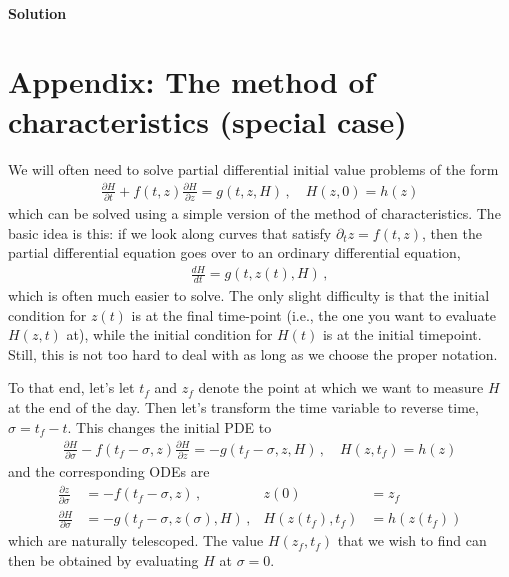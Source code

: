 \documentclass[11pt]{article}
\begin{document}
\paragraph{Solution}

\section{Appendix: The method of characteristics (special case)}

We will often need to solve partial differential initial value problems of the form
\begin{align}
\frac{\partial H}{\partial t} + f(t,z) \frac{\partial H}{\partial z} = g(t,z,H) \, , \quad H(z,0) = h(z) 
\end{align}
which can be solved using a simple version of the method of characteristics. The basic idea is this: if we look along curves that satisfy $\partial_t z = f(t,z)$, then the partial differential equation goes over to an ordinary differential equation,
\begin{align}
\frac{d H}{dt} = g(t,z(t),H) \, ,
\end{align} 
which is often much easier to solve. The only slight difficulty is that the initial condition for $z(t)$ is at the final time-point (i.e., the one you want to evaluate $H(z,t)$ at), while the initial condition for $H(t)$ is at the initial timepoint. Still, this is not too hard to deal with as long as we choose the proper notation. 

To that end, let's let $t_f$ and $z_f$ denote the point at which we want to measure $H$ at the end of the day. Then let's transform the time variable to reverse time, $\sigma = t_f - t$. This changes the initial PDE to
\begin{align}
\frac{\partial H}{\partial \sigma} - f(t_f-\sigma,z) \frac{\partial H}{\partial z} = -g(t_f-\sigma,z,H) \, , \quad H(z,t_f) = h(z) 
\end{align}
and the corresponding ODEs are
\begin{align}
\frac{\partial z}{\partial \sigma} & = - f(t_f-\sigma,z) \, , & z(0) & = z_f \\
\frac{\partial H}{\partial \sigma} & = - g(t_f-\sigma,z(\sigma),H) \, , & H(z(t_f),t_f) & = h(z(t_f)) 
\end{align}
which are naturally telescoped. The value $H(z_f,t_f)$ that we wish to find can then be obtained by evaluating $H$ at $\sigma=0$. 
\end{document}
